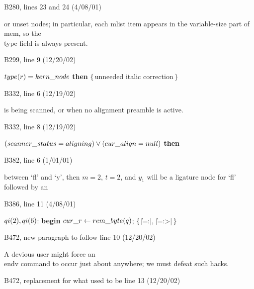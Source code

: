 {\bugonpage B280, lines 23 and 24 (4/08/01)

\tenpoint\noindent
or unset nodes; in particular, each mlist item appears in the
variable-size part of \\{mem}, so the \\{type} field is always present.

\bugonpage B299, line 9 (12/20/02)

\ninepoint\noindent
\qquad\qquad{} $\\{type}(r)=\\{kern\_node}$ {\bf then}
 \quad$\{\,$unneeded italic correction$\,\}$

\bugonpage B332, line 6 (12/19/02)

\tenpoint\noindent
is being scanned, or when no alignment preamble is active.

\bugonpage B332, line 8 (12/19/02)

\ninepoint\noindent
{} $(\\{scanner\_status}=\\{aligning}) \lor
 (\\{cur\_align}=\\{null})$ {\bf then}

\bugonpage B382, line 6 (1/01/01)

\tenpoint\noindent
between `fl' and `y', then $m=2$, $t=2$, and $y_1$ will
be a ligature node for `fl' followed by an\cutpar

\bugonpage B386, line 11 (4/08/01)

\ninepoint\noindent
\quad$\\{qi}(2),\\{qi}(6)$: {\bf begin} $\\{cur\_r}\gets\\{rem\_byte}(q)$;%
 \quad$\{\,$\||=:|, \||=:>|$\,\}$

\bugonpage B472, new paragraph to follow line 10 (12/20/02)

\tenpoint\noindent\quad
A devious user might force an \\{endv} command to occur just about anywhere;
we must defeat such hacks.

\bugonpage B472, replacement for what used to be line 13 (12/20/02)

}
